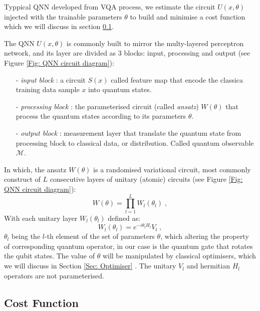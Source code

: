 Typpical QNN developed from VQA process, we estimate the circuit $U(x,\theta)$ injected with the trainable parameters $\theta$ to build and minimise a cost function which we will discuss in section \ref{Sec: Cost Function}.

The QNN $U(x,\theta)$ is commonly built to mirror the multy-layered perceptron network, and its layer are divided as 3 blocks: input, processing and output \cite{cerezoVariationalQuantumAlgorithms2021} (see Figure \ref{Fig: QNN circuit diagram}):

\begin{itemize}[align=left]
    \item[- \emph{input block}]: a circuit $S(x)$ called feature map that encode the classica training data sample $x$ into quantum states.
    \item[- \emph{processing block}]: the parameterised circuit (called \emph{ansatz}) $W(\theta)$ that process the quantum states according to its parameters $\theta$.
    \item[- \emph{output block}]: measurement layer that translate the quantum state from processing block to classical data, or distribution. Called quantum observable $\mathcal{M}$.
\end{itemize}

In which, the ansatz $W(\theta)$ is a randomised variational circuit, most commonly construct of $L$ consecutive layers of unitary (atomic) circuits (see Figure \ref{Fig: QNN circuit diagram}):
\begin{equation}
    W(\theta) = \prod_{l=1}^L W_l(\theta_l)\;,
    \label{Eqn: Ansatz}
\end{equation}
With each unitary layer $W_l(\theta_l)$ defined as:
\begin{equation}
    W_l(\theta_l) = e^{-i\theta_l H_l}V_l \;,
    \label{Eqn: Ansatz layer}
\end{equation}
$\theta_l$ being the $l$-th element of the set of parameters $\theta$, which altering the property of corresponding quantum operator, in our case is the quantum gate that rotates the qubit states.
The value of $\theta$ will be manipulated by classical optimisers, which we will discuss in Section \ref{Sec: Optimiser} \cite{cerezoVariationalQuantumAlgorithms2021}.
The unitary $V_l$ and hermitian $H_l$ operators are not parameterised.

\subsection{Cost Function} \label{Sec: Cost Function}

